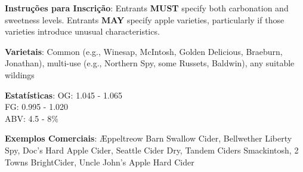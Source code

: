 \textbf{Instruções para Inscrição}: Entrants \textbf{MUST} specify both carbonation and sweetness levels. Entrants \textbf{MAY} specify apple varieties, particularly if those varieties introduce unusual characteristics.

\textbf{Varietais}: Common (e.g., Winesap, McIntosh, Golden Delicious, Braeburn, Jonathan), multi-use (e.g., Northern Spy, some Russets, Baldwin), any suitable wildings

\textbf{Estatísticas}: OG: 1.045 - 1.065 \\
\phantom{ } \hspace{16.5mm} FG: 0.995 - 1.020 \\
\phantom{ } \hspace{16.5mm} ABV: 4.5 - 8\%

\textbf{Exemplos Comerciais}: Æppeltreow Barn Swallow Cider, Bellwether Liberty Spy, Doc’s Hard Apple Cider, Seattle Cider Dry, Tandem Ciders Smackintosh, 2 Towns BrightCider, Uncle John’s Apple Hard Cider